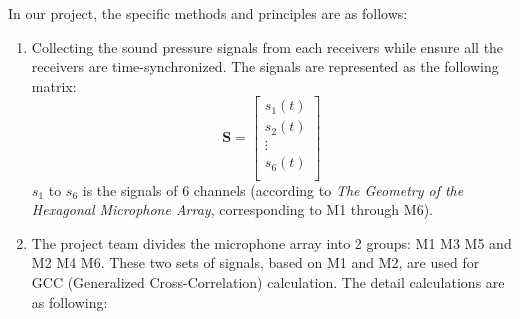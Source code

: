 In our project, the specific methods and principles are as follows:
\begin{enumerate}
    \item Collecting the sound pressure signals from each receivers while ensure all the receivers are time-synchronized. The signals are represented as the following matrix:
    \[
        \mathbf{S} = 
        \begin{bmatrix}
            s_1(t)\\
            s_2(t)\\
            \vdots\\
            s_6(t)\\
        \end{bmatrix}
    \]
    \(s_1\) to \(s_6\) is the signals of 6 channels (according to \textit{ The Geometry of the Hexagonal Microphone Array}, corresponding to M1 through M6).
    \item The project team divides the microphone array into 2 groups: M1 M3 M5 and M2 M4 M6. These two sets of signals, based on M1 and M2, are used for GCC (Generalized Cross-Correlation) calculation. The detail calculations are as following:
    
\end{enumerate}

